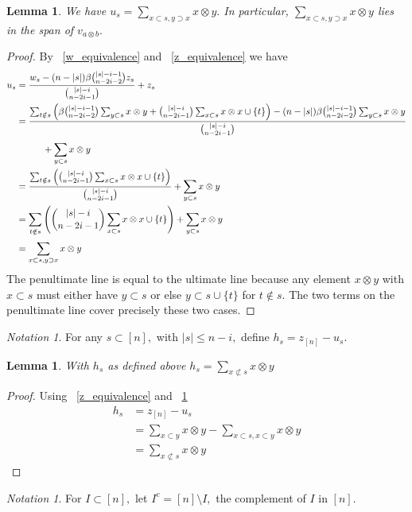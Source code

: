 \documentclass{amsart}
\newtheorem{lem}[thm]{Lemma}
\theoremstyle{remark}
\newtheorem{note}[thm]{Notation}
\begin{document}
\begin{lem}
\label{u_equivalence}
We have $u_s = \sum_{x\subset s,y\supset x}^{}x\otimes y.$ In particular, $\sum_{x\subset s,y\supset x}^{}x\otimes y$ lies in the span of $v_{a\otimes b}.$
\end{lem}
\begin{proof}
By ~\ref{w_equivalence} and ~\ref{z_equivalence} we have
\begin{align*}
	u_s &= \frac{w_s - (n - |s|)\beta \binom {|s|-i-1}{n-2i-2} z_s}{\binom {|s|-i}{n-2i-1}} + z_s\\
	&= \frac{\sum_{t\notin s}^{} \left(\beta \binom {|s|-i-1}{n-2i-2}\sum_{y \subset s}^{}x\otimes y + \binom {|s|-i}{n-2i-1}\sum_{x \subset s}^{}x \otimes x \cup \{t\} \right) - (n - |s|)\beta \binom {|s|-i-1}{n-2i-2} \sum_{y \subset s}^{}x\otimes y}{\binom {|s|-i}{n-2i-1}} 
	\\
	& \hspace{1 cm}+ \sum_{y \subset s}^{}x\otimes y \\
	&=  \frac{\sum_{t\notin s}^{} \left(\binom {|s|-i}{n-2i-1}\sum_{x \subset s}^{}x \otimes x \cup \{t\} \right)}{\binom {|s|-i}{n-2i-1}} + \sum_{y \subset s}^{}x\otimes y \\
	&= \sum_{t\notin s}^{} \left(\binom {|s|-i}{n-2i-1}\sum_{x \subset s}^{}x \otimes x \cup \{t\} \right) + \sum_{y \subset s}^{}x\otimes y \\
	&=  \sum_{x\subset s,y\supset x}^{}x\otimes y
\end{align*}
The penultimate line is equal to the ultimate line because any element $x\otimes y$ with $x \subset s$ must either have $y \subset s$ or else $y \subset s \cup \{t\}$ for $t \notin s.$ The two terms on the penultimate line cover precisely these two cases.
\end{proof}

\begin{note}
For any $s \subset [n],$ with $|s| \leq n-i,$ define $h_s = z_{[n]} - u_s.$
\end{note}

\begin{lem}
\label{h_equivalence}
With $h_s$ as defined above $h_s = \sum_{x\not\subset s}^{}x\otimes y$
\end{lem}
\begin{proof}
Using ~\ref{z_equivalence} and ~\ref{u_equivalence}
\begin{align*}
	h_s &= z_{[n]} - u_s \\
	&= \sum_{x\subset y}^{}x\otimes y-\sum_{x\subset s,x\subset y}^{}x\otimes y\\
	&= \sum_{x\not\subset s}^{}x\otimes y
\end{align*}
\end{proof}
\begin{note}
For $I \subset[n],$ let $I^c = [n]\setminus I,$ the complement of $I$ in $[n].$
\end{note}
\end{document}
